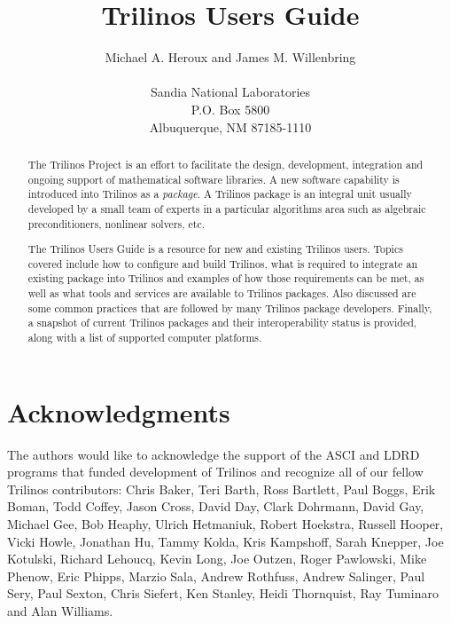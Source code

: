 \documentclass[12pt,relax]{TrilinosUserGuide}
\title{Trilinos Users Guide}
\author{
Michael A. Heroux and James M. Willenbring \\
 \\
Sandia National Laboratories \\
P.O. Box 5800 \\
Albuquerque, NM 87185-1110
}
\date{} %
\begin{document}
\maketitle
\begin{abstract}

The Trilinos Project is an effort to facilitate the design, development,
integration and ongoing support of mathematical software libraries.
A new software capability is introduced into Trilinos as a {\it
package}.  A Trilinos package is an integral unit usually developed by
a small team of experts in a particular algorithms area such as
algebraic preconditioners, nonlinear solvers, etc.

The Trilinos Users Guide is a resource for new and existing
Trilinos users.  Topics covered include how to configure and
build Trilinos, what is required to integrate an existing package into Trilinos
and examples of how those requirements can be met, as well as what
tools and services are
available to Trilinos packages.  Also discussed are some common practices that
are followed by many Trilinos package developers.  Finally, a snapshot
of current Trilinos packages and their interoperability status
is provided, along with a list of supported computer platforms.

\end{abstract}

\clearpage

\section*{Acknowledgments}
The authors would like to acknowledge the support of the ASCI and LDRD
programs that funded development of Trilinos and recognize all of our fellow
Trilinos contributors: Chris Baker, Teri Barth, Ross Bartlett, Paul Boggs, Erik 
Boman, Todd Coffey, Jason Cross, David Day, Clark Dohrmann, David Gay,
Michael Gee, Bob Heaphy, Ulrich Hetmaniuk, Robert Hoekstra, Russell Hooper,
Vicki Howle, Jonathan Hu, Tammy Kolda, Kris Kampshoff, Sarah Knepper, Joe 
Kotulski, Richard Lehoucq, Kevin Long, Joe Outzen, Roger Pawlowski, Mike Phenow, 
Eric Phipps, Marzio Sala, Andrew Rothfuss, Andrew Salinger, Paul Sery, Paul 
Sexton, Chris Siefert, Ken Stanley, Heidi Thornquist, Ray Tuminaro and Alan Williams.

\clearpage
\tableofcontents
\listoffigures
\listoftables

\clearpage

\end{document}
